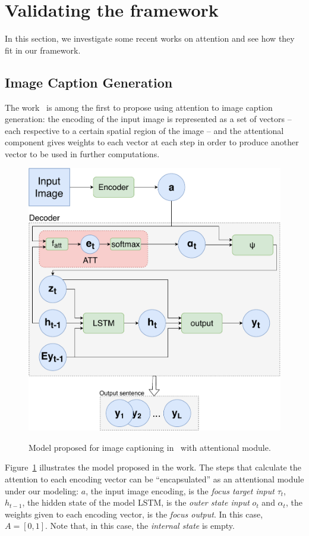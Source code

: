 \documentclass[11pt]{article}
\begin{document}
\section{Validating the framework}
In this section, we investigate some recent works on attention and see how they fit in our framework.

\subsection{Image Caption Generation}
The work~\cite{ref:show-attend-tell} is among the first to propose using
attention to image caption generation: the encoding of the input image is
represented as a set of vectors -- each respective to a certain spatial region of the image --
and the attentional component gives weights to each vector at each step in order to produce another
vector to be used in further computations.

\begin{figure}[H]
    \centering
    \includegraphics[width=0.7\linewidth]{./img/captioning.pdf}
    \label{fig:captioning}
    \caption{Model proposed for image captioning in~\cite{ref:show-attend-tell} with attentional module.}
\end{figure}

Figure~\ref{fig:captioning} illustrates the model proposed in the work.
The steps that calculate the attention to each encoding vector can be ``encapsulated'' as
an attentional module under our modeling:
$a$, the input image encoding, is the \emph{focus target input} $\tau_t$,
$h_{t-1}$, the hidden state of the model LSTM, is the \emph{outer state input} $o_t$
and $\alpha_t$, the weights given to each encoding vector, is the \emph{focus output}. In this case, $A = [0, 1]$.
Note that, in this case, the \emph{internal state} is empty.
\end{document}
